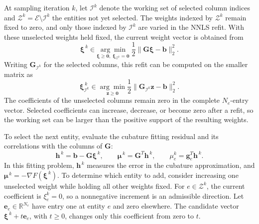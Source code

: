 \documentclass[a4paper,12pt]{article}
\newcommand{\vect}[1]{\boldsymbol{#1}}
\newcommand{\matr}[1]{\boldsymbol{#1}}
\begin{document}
At sampling iteration $k$, let $\mathcal I^k$ denote the working set of selected column indices and $\mathcal Z^k=\mathcal E\setminus\mathcal I^k$ the entities not yet selected. The weights indexed by $\mathcal Z^k$ remain fixed to zero, and only those indexed by $\mathcal I^k$ are varied in the NNLS refit. With these unselected weights held fixed, the current weight vector is obtained from
\begin{equation}
 \vect{\xi}^{\,k}\in
 \underset{\vect{\xi}\geq\vect{0},\;\vect{\xi}_{\mathcal Z^k}=\vect{0}}{\arg\min}\;
 \frac12\|\matr{G}\vect{\xi}-\vect{b}\|_2^2.
 \label{eq:classical-nnls}
\end{equation}
Writing $\matr{G}_{\mathcal I^k}$ for the selected columns, this refit can be computed on the smaller matrix as
\begin{equation}
 \vect{\xi}^{\,k}_{\mathcal I^k}\in
 \underset{\vect{z}\geq\vect{0}}{\arg\min}
 \frac12\|\matr{G}_{\mathcal I^k}\vect{z}-\vect{b}\|_2^2.
 \label{eq:classical-selected-fit}
\end{equation}
The coefficients of the unselected columns remain zero in the complete $N_e$-entry vector. Selected coefficients can increase, decrease, or become zero after a refit, so the working set can be larger than the positive support of the resulting weights.

To select the next entity, evaluate the cubature fitting residual and its correlations with the columns of $\matr{G}$:
\begin{equation}
 \vect{h}^{\,k}=\vect{b}-\matr{G}\vect{\xi}^{\,k},
 \qquad
 \vect{\mu}^{\,k}=\matr{G}^T\vect{h}^{\,k},
 \qquad
 \mu_e^k=\vect{g}_e^T\vect{h}^{\,k}.
 \label{eq:classical-score}
\end{equation}
In this fitting problem, $\vect{h}^{\,k}$ measures the error in the cubature approximation, and $\vect{\mu}^{\,k}=-\nabla F(\vect{\xi}^{\,k})$. To determine which entity to add, consider increasing one unselected weight while holding all other weights fixed. For $e\in\mathcal Z^k$, the current coefficient is $\xi_e^k=0$, so a nonnegative increment is an admissible direction. Let $\vect{e}_e\in\mathbb R^{N_e}$ have entry one at entity $e$ and zero elsewhere. The candidate vector $\vect{\xi}^{\,k}+t\vect{e}_e$, with $t\geq0$, changes only this coefficient from zero to $t$.
\end{document}
